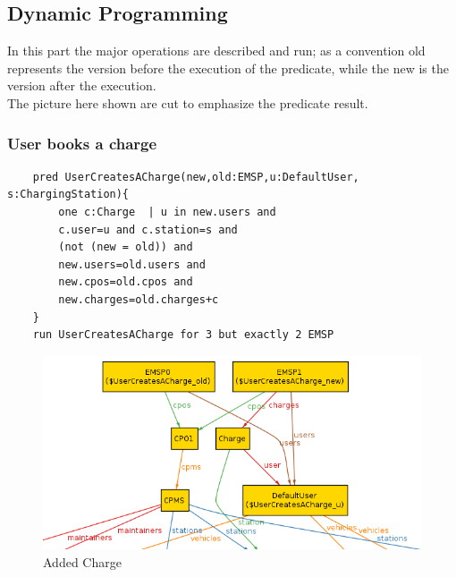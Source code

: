 \subsection{Dynamic Programming}
In this part the major operations are described and run; as a convention old represents the version before the execution of the predicate, while the new is the version after the execution.\\
The picture here shown are cut to emphasize the predicate result.

\subsubsection{User books a charge}
\begin{verbatim}
    pred UserCreatesACharge(new,old:EMSP,u:DefaultUser, s:ChargingStation){
        one c:Charge  | u in new.users and
        c.user=u and c.station=s and  
        (not (new = old)) and  
        new.users=old.users and
        new.cpos=old.cpos and 
        new.charges=old.charges+c
    }
    run UserCreatesACharge for 3 but exactly 2 EMSP  
\end{verbatim}

\begin{figure}[H]
    \includegraphics[keepaspectratio, width=16cm]{Alloy/UserCreateCharge.png}
    \caption{Added Charge}
\end{figure}

